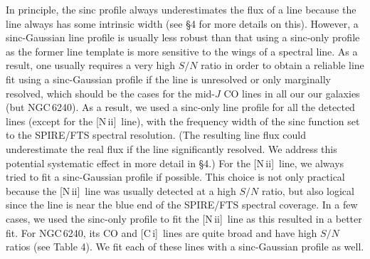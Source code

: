 \documentclass[preprint]{aastex}
\newcommand{\CI}{[C\,{\sc i}]}
\newcommand{\NII}{\mbox{[N\,{\sc ii}]}}
\begin{document}
In principle, the sinc profile always underestimates the flux of a line because
the line always has some intrinsic width (see \S4 for more details on this). However, 
a sinc-Gaussian line profile is usually less robust than that using a sinc-only 
profile as the former line template is more sensitive to the wings 
of a spectral line.  As a result, one usually requires a very high $S/N$ ratio in
order to obtain a reliable line fit using a sinc-Gaussian profile if the line is 
unresolved or only marginally resolved, which should be the cases for the mid-$J$ 
CO lines in all our our galaxies (but NGC\,6240).   As a result, we used a sinc-only
line profile for all the detected lines (except for the \NII\ line), with 
the frequency width of the sinc function set to the SPIRE/FTS spectral resolution.
(The resulting line flux could underestimate the real flux if the line significantly
resolved. We address this potential systematic effect in more detail in \S4.)  
For the \NII\ line, we always tried to fit a sinc-Gaussian profile if possible.  
This choice is not only practical because the \NII\ line was usually detected at 
a high $S/N$ ratio, but also logical since the line is near the blue end of 
the SPIRE/FTS spectral coverage.  In a few cases, we used the sinc-only profile 
to fit the \NII\ line as this resulted in a better fit.  For NGC\,6240, its CO 
and \CI\ lines are quite broad and have high $S/N$ ratios (see Table 4). We fit 
each of these lines with a sinc-Gaussian profile as well.  
\end{document}
